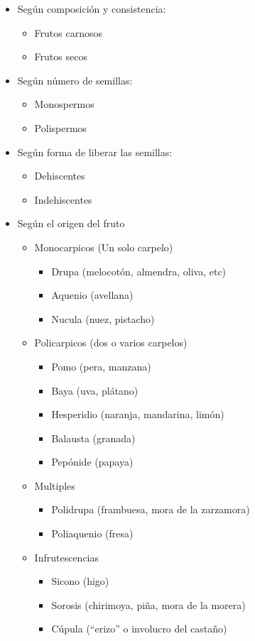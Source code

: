 \documentclass[a4paper,12pt,oneside]{book}
\begin{document}
\begin{itemize}
\item Según composición y consistencia:
\begin{itemize}
\item Frutos carnosos
\item Frutos secos
\end{itemize}
\item Según número de semillas:
\begin{itemize}
\item Monospermos
\item Polispermos
\end{itemize}
\item Según forma de liberar las semillas:
\begin{itemize}
\item Dehiscentes
\item Indehiscentes
\end{itemize}
\item Según el origen del fruto
\begin{itemize}
\item Monocarpicos (Un solo carpelo)
\begin{itemize}
\item Drupa (melocotón, almendra, oliva, etc)
\item Aquenio (avellana)
\item Nucula (nuez, pistacho)
\end{itemize}
\item Policarpicos (dos o varios carpelos)
\begin{itemize}
\item Pomo (pera, manzana)
\item Baya (uva, plátano)
\item Hesperidio (naranja, mandarina, limón)
\item Balausta (granada)
\item Pepónide (papaya)
\end{itemize}
\item Multiples
\begin{itemize}
\item Polidrupa (frambuesa, mora de la zarzamora)
\item Poliaquenio (fresa)
\end{itemize}
\item Infrutescencias
\begin{itemize}
\item Sicono (higo)
\item Sorosis (chirimoya, piña, mora de la morera)
\item Cúpula (``erizo'' o involucro del castaño)
\end{itemize}
\end{itemize}
\end{itemize}
\end{document}
